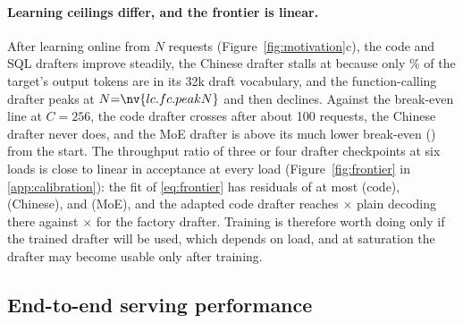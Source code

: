 \paragraph{Learning ceilings differ, and the frontier is linear.} After learning online from $N$ requests (Figure~\ref{fig:motivation}c), the code and SQL drafters improve steadily, the Chinese drafter stalls at  because only \% of the target's output tokens are in its 32k draft vocabulary, and the function-calling drafter peaks at $N{=}\nv{lc.fc.peakN}$ and then declines. Against the break-even line at $C{=}256$, the code drafter crosses after about 100 requests, the Chinese drafter never does, and the MoE drafter is above its much lower break-even () from the start. The throughput ratio of three or four drafter checkpoints at six loads is close to linear in acceptance at every load (Figure~\ref{fig:frontier} in \cref{app:calibration}): the fit of \cref{eq:frontier} has residuals of at most  (code),  (Chinese), and  (MoE), and the adapted code drafter reaches $\times$ plain decoding there against $\times$ for the factory drafter. Training is therefore worth doing only if the trained drafter will be used, which depends on load, and at saturation the drafter may become usable only after training.

\subsection{End-to-end serving performance}\label{sec:results}

\begin{table}[t]
\caption{Phase-B (saturated) throughput relative to : paired mean $\pm$ sd over three repetitions, \%. Parentheses: fraction of the best policy in the scenario (bold);  row: absolute throughput; last column: smallest fraction over the three scenarios.}
\label{tab:main}
\centering\small

\end{table}

